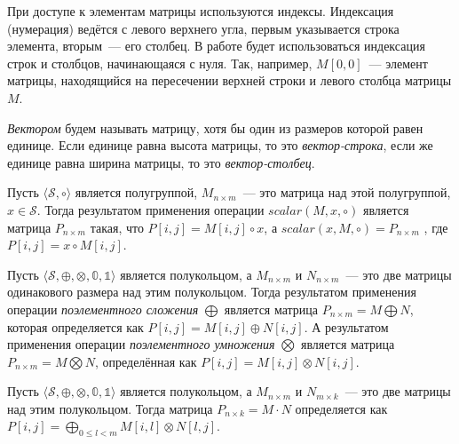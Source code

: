 При доступе к элементам матрицы используются индексы. Индексация (нумерация) ведётся с левого верхнего угла, первым указывается строка элемента, вторым~--- его столбец. В работе будет использоваться индексация строк и столбцов, начинающаяся с нуля. Так, например, $M[0, 0]$~--- элемент матрицы, находящийся на пересечении верхней строки и левого столбца матрицы $M$.

\begin{definition}[Вектор]
\emph{Вектором} будем называть матрицу, хотя бы один из размеров которой равен единице. Если единице равна высота матрицы, то это \textit{вектор-строка}, если же единице равна ширина матрицы, то это \textit{вектор-столбец}.
\end{definition}

\begin{definition}
Пусть $\langle \mathcal{S}, \circ \rangle$ является полугруппой, $M_{n \times m}$~--- это матрица над этой полугруппой, $x \in \mathcal{S}$.
Тогда результатом применения операции
$
scalar(M, x, \circ)  
$
является матрица
$
P_{n \times m}
$
такая, что $P[i, j] = M[i, j] \circ x$, а
$
scalar(x, M, \circ) = P_{n \times m}
$
, где $P[i, j] = x \circ M[i, j]$.

\end{definition}

\begin{definition}

Пусть $\langle \mathcal{S}, \oplus, \otimes, \mathbb{0}, \mathbb{1} \rangle$ является полукольцом, а $M_{n \times m}$ и $ N_{n \times m}$~--- это две матрицы одинакового размера над этим полукольцом.
Тогда результатом применения операции \textit{поэлементного сложения} $\bigoplus$ является матрица
$
P_{n \times m}= M \bigoplus N
$,
которая определяется как $P[i, j] = M[i, j] \oplus N[i, j]$. А результатом применения операции \textit{поэлементного умножения} $\bigotimes$ является матрица
$
P_{n \times m}= M \bigotimes N
$,
определённая как $P[i, j] = M[i, j] \otimes N[i, j]$.

\end{definition}

\begin{definition}\label{def:MxM}

Пусть $\langle \mathcal{S}, \oplus, \otimes, \mathbb{0}, \mathbb{1} \rangle$ является полукольцом, а $M_{n \times m}$ и $ N_{m \times k}$~--- это две матрицы над этим полукольцом.
Тогда матрица
$
P_{n \times k}= M \cdot N
$
определяется как $P[i, j] = \bigoplus_{0 \leq l < m} M[i, l] \otimes N[l, j]$.

\end{definition}

